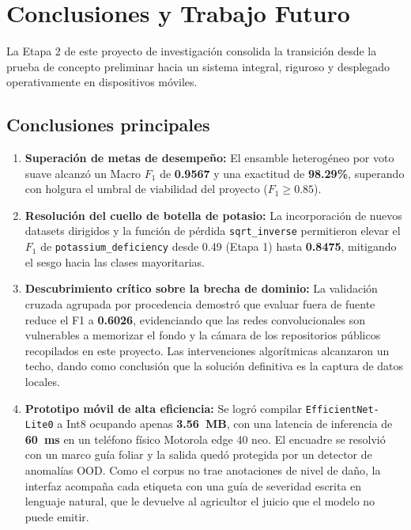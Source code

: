 \documentclass[12pt,letterpaper]{article}
\begin{document}
\newpage

\section{Conclusiones y Trabajo Futuro}

La Etapa 2 de este proyecto de investigaci\'on consolida la transici\'on desde la prueba de concepto preliminar hacia un sistema integral, riguroso y desplegado operativamente en dispositivos m\'oviles.

\subsection{Conclusiones principales}
\begin{enumerate}
\item \textbf{Superaci\'on de metas de desempe\~no:} El ensamble heterog\'eneo por voto suave alcanz\'o un Macro $F_1$ de \textbf{0.9567} y una exactitud de \textbf{98.29\%}, superando con holgura el umbral de viabilidad del proyecto ($F_1 \geq 0.85$). 
\item \textbf{Resoluci\'on del cuello de botella de potasio:} La incorporaci\'on de nuevos datasets dirigidos y la funci\'on de p\'erdida \texttt{sqrt\_inverse} permitieron elevar el $F_1$ de \texttt{potassium\_deficiency} desde 0.49 (Etapa 1) hasta \textbf{0.8475}, mitigando el sesgo hacia las clases mayoritarias.
\item \textbf{Descubrimiento cr\'itico sobre la brecha de dominio:} La validaci\'on cruzada agrupada por procedencia demostr\'o que evaluar fuera de fuente reduce el F1 a \textbf{0.6026}, evidenciando que las redes convolucionales son vulnerables a memorizar el fondo y la c\'amara de los repositorios p\'ublicos recopilados en este proyecto. Las intervenciones algor\'itmicas alcanzaron un techo, dando como conclusión que la soluci\'on definitiva es la captura de datos locales.
\item \textbf{Prototipo m\'ovil de alta eficiencia:} Se logr\'o compilar \texttt{EfficientNet-Lite0} a Int8 ocupando apenas \textbf{3.56~MB}, con una latencia de inferencia de \textbf{60~ms} en un tel\'efono f\'isico Motorola edge 40 neo. El encuadre se resolvi\'o con un marco gu\'ia foliar y la salida qued\'o protegida por un detector de anomal\'ias OOD. Como el corpus no trae anotaciones de nivel de da\~no, la interfaz acompa\~na cada etiqueta con una gu\'ia de severidad escrita en lenguaje natural, que le devuelve al agricultor el juicio que el modelo no puede emitir.
\end{enumerate}
\end{document}
